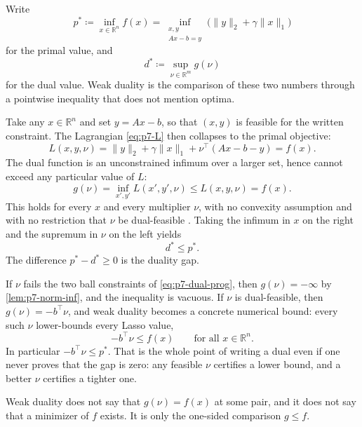 \begin{remark}
\label{rem:p7-weak}
Write
\[
p^{*}
\coloneqq
\inf_{x\in\mathbb{R}^{n}}f(x)
=
\inf_{\substack{x,y\\Ax-b=y}}
\bigl(\|y\|_{2}+\gamma\|x\|_{1}\bigr)
\]
for the primal value, and
\[
d^{*}
\coloneqq
\sup_{\nu\in\mathbb{R}^{m}}g(\nu)
\]
for the dual value. Weak duality is the comparison of these two numbers through a pointwise inequality that does not mention optima.

Take any \(x\in\mathbb{R}^{n}\) and set \(y=Ax-b\), so that \((x,y)\) is feasible for the written constraint. The Lagrangian \eqref{eq:p7-L} then collapses to the primal objective:
\[
L(x,y,\nu)
=
\|y\|_{2}+\gamma\|x\|_{1}+\nu^{\top}(Ax-b-y)
=
f(x).
\]
The dual function is an unconstrained infimum over a larger set, hence cannot exceed any particular value of \(L\):
\[
g(\nu)
=
\inf_{x',y'}L(x',y',\nu)
\le
L(x,y,\nu)
=
f(x).
\]
This holds for every \(x\) and every multiplier \(\nu\), with no convexity assumption and with no restriction that \(\nu\) be dual-feasible \cite[\S5.1.3]{boyd04}. Taking the infimum in \(x\) on the right and the supremum in \(\nu\) on the left yields
\[
d^{*}\le p^{*}.
\]
The difference \(p^{*}-d^{*}\ge 0\) is the duality gap.

If \(\nu\) fails the two ball constraints of \eqref{eq:p7-dual-prog}, then \(g(\nu)=-\infty\) by \cref{lem:p7-norm-inf}, and the inequality is vacuous. If \(\nu\) is dual-feasible, then \(g(\nu)=-b^{\top}\nu\), and weak duality becomes a concrete numerical bound: every such \(\nu\) lower-bounds every Lasso value,
\[
-b^{\top}\nu
\le
f(x)
\qquad
\text{for all }x\in\mathbb{R}^{n}.
\]
In particular \(-b^{\top}\nu\le p^{*}\). That is the whole point of writing a dual even if one never proves that the gap is zero: any feasible \(\nu\) certifies a lower bound, and a better \(\nu\) certifies a tighter one.

Weak duality does not say that \(g(\nu)=f(x)\) at some pair, and it does not say that a minimizer of \(f\) exists. It is only the one-sided comparison \(g\le f\).
\end{remark}

